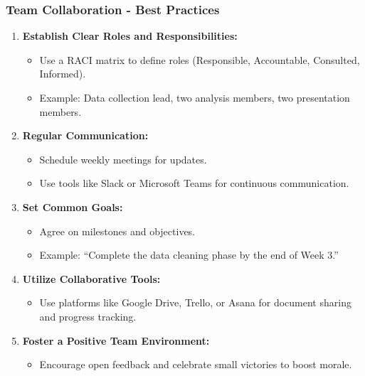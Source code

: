 \documentclass[aspectratio=169]{beamer}
\begin{document}
\begin{frame}[fragile]
    \frametitle{Team Collaboration - Best Practices}
    \begin{enumerate}
        \item \textbf{Establish Clear Roles and Responsibilities:}
            \begin{itemize}
                \item Use a RACI matrix to define roles (Responsible, Accountable, Consulted, Informed).
                \item Example: Data collection lead, two analysis members, two presentation members.
            \end{itemize}
        
        \item \textbf{Regular Communication:}
            \begin{itemize}
                \item Schedule weekly meetings for updates.
                \item Use tools like Slack or Microsoft Teams for continuous communication.
            \end{itemize}

        \item \textbf{Set Common Goals:}
            \begin{itemize}
                \item Agree on milestones and objectives.
                \item Example: “Complete the data cleaning phase by the end of Week 3.”
            \end{itemize}
        
        \item \textbf{Utilize Collaborative Tools:}
            \begin{itemize}
                \item Use platforms like Google Drive, Trello, or Asana for document sharing and progress tracking.
            \end{itemize}
        
        \item \textbf{Foster a Positive Team Environment:}
            \begin{itemize}
                \item Encourage open feedback and celebrate small victories to boost morale.
            \end{itemize}
    \end{enumerate}
\end{frame}
\end{document}

